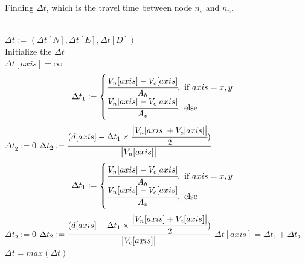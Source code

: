 \documentclass[journal]{./template/IEEEtran}
\let\oldnl\nl%
\newcommand{\nonl}{\renewcommand{\nl}{\let\nl\oldnl}}
\begin{document}
\SetNlSty{}{\color{red}}{:}
\SetAlFnt{\color{red}}
\begin{algorithm}[htp]
\caption{Finding $\Delta t$, which is the travel time between node $n_c$ and $n_n$.}
\SetAlgoLined
{}
\nonl \hrulefill \\
$\Delta t$ := $(\Delta t[N], \Delta t[E], \Delta t[D])$ \\
Initialize the $\Delta t$ \\
{
{
$\Delta t[axis] = \infty $
 }
{ \begin{equation*}
\small{ \Delta t_1 :=
\begin{cases}
\cfrac{V_n[axis] - V_c[axis]}{A_h},~\text{if $axis = x,y$}\\
\cfrac{V_n[axis] - V_c[axis]}{A_v},~\text{else}\\
\end{cases}
}
\end{equation*}
{
    $\Delta t_2 := 0$
}
\Else
{
    $\Delta t_2 := \cfrac{(d[axis] - \Delta t_1 \times \cfrac{\abs{V_n[axis] + V_c[axis]}}{2})}{\abs{V_n[axis]}}$
}
}
\Else
{
\begin{equation*}
\small{
\Delta t_1 := 
\begin{cases}
\cfrac{V_n[axis] - V_c[axis]}{A_h},~\text{if $axis = x,y$}\\
\cfrac{V_n[axis] - V_c[axis]}{A_v},~\text{else}\\
\end{cases}
}
\end{equation*}
{
    $\Delta t_2 := 0$
}
\Else
{
        $\Delta t_2 := \cfrac{(d[axis] - \Delta t_1 \times \cfrac{\abs{V_n[axis] + V_c[axis]}}{2})}{\abs{V_c[axis]}}$
}
}
  $\Delta t[axis] = \Delta t_1 + \Delta t_2$
}
\Return $\Delta t = max(\Delta t)$ 
\end{algorithm}
\SetNlSty{}{\color{black}}{:}
\SetAlFnt{\color{black}}
\end{document}
